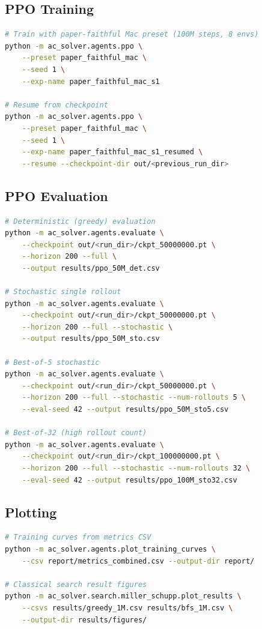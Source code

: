 \documentclass[11pt,a4paper]{article}
\begin{document}
\subsection{PPO Training}

\begin{lstlisting}[language=bash]
# Train with paper-faithful Mac preset (100M steps, 8 envs)
python -m ac_solver.agents.ppo \
    --preset paper_faithful_mac \
    --seed 1 \
    --exp-name paper_faithful_mac_s1

# Resume from checkpoint
python -m ac_solver.agents.ppo \
    --preset paper_faithful_mac \
    --seed 1 \
    --exp-name paper_faithful_mac_s1_resumed \
    --resume --checkpoint-dir out/<previous_run_dir>
\end{lstlisting}

\subsection{PPO Evaluation}

\begin{lstlisting}[language=bash]
# Deterministic (greedy) evaluation
python -m ac_solver.agents.evaluate \
    --checkpoint out/<run_dir>/ckpt_50000000.pt \
    --horizon 200 --full \
    --output results/ppo_50M_det.csv

# Stochastic single rollout
python -m ac_solver.agents.evaluate \
    --checkpoint out/<run_dir>/ckpt_50000000.pt \
    --horizon 200 --full --stochastic \
    --output results/ppo_50M_sto.csv

# Best-of-5 stochastic
python -m ac_solver.agents.evaluate \
    --checkpoint out/<run_dir>/ckpt_50000000.pt \
    --horizon 200 --full --stochastic --num-rollouts 5 \
    --eval-seed 42 --output results/ppo_50M_sto5.csv

# Best-of-32 (high rollout count)
python -m ac_solver.agents.evaluate \
    --checkpoint out/<run_dir>/ckpt_100000000.pt \
    --horizon 200 --full --stochastic --num-rollouts 32 \
    --eval-seed 42 --output results/ppo_100M_sto32.csv
\end{lstlisting}

\subsection{Plotting}

\begin{lstlisting}[language=bash]
# Training curves from metrics CSV
python -m ac_solver.agents.plot_training_curves \
    --csv report/metrics_combined.csv --output-dir report/

# Classical search result figures
python -m ac_solver.search.miller_schupp.plot_results \
    --csvs results/greedy_1M.csv results/bfs_1M.csv \
    --output-dir results/figures/
\end{lstlisting}
\end{document}
